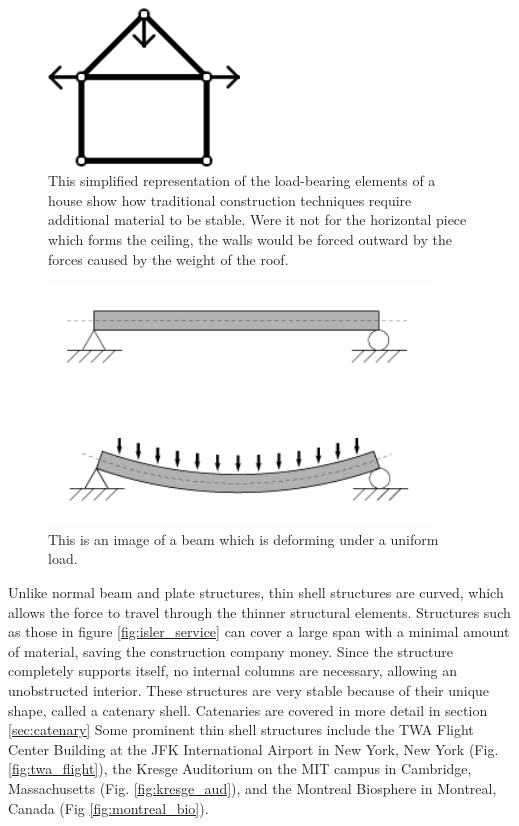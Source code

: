 \documentclass{thesis}
\begin{document}
\begin{figure}
\centering
\includegraphics[width=2in]{images/house.png}
\caption[Simplified representation of a house]{This simplified representation of the load-bearing elements of a house show how traditional
construction techniques require additional material to be stable.  Were it not for the horizontal piece which forms the ceiling, the walls
would be forced outward by the forces caused by the weight of the roof.}
\label{fig:house}
\end{figure}

\begin{figure}
\centering
\includegraphics[width=4in]{images/Bending.png}
\caption[A beam under uniform loading]{This is an image of a beam which is deforming under a uniform load. \cite{img:bending}}
\label{fig:bending}
\end{figure}

Unlike normal beam and plate structures, thin shell structures are curved, which allows the force to travel through the thinner structural
elements.  Structures such as those in figure \ref{fig:isler_service} can cover a large span with a minimal amount of material, saving the
construction company money.  Since the structure completely supports itself, no internal columns are necessary, allowing an unobstructed interior.
These structures are very stable because of their unique shape, called a catenary shell.  Catenaries are covered in more detail in section
\ref{sec:catenary}  Some prominent thin shell structures include
the TWA Flight Center Building at the JFK International Airport in New York, New York (Fig. \ref{fig:twa_flight}), the Kresge Auditorium on
the MIT campus in Cambridge, Massachusetts (Fig. \ref{fig:kresge_aud}), and the Montreal Biosphere in Montreal, Canada (Fig \ref{fig:montreal_bio}).
\end{document}
